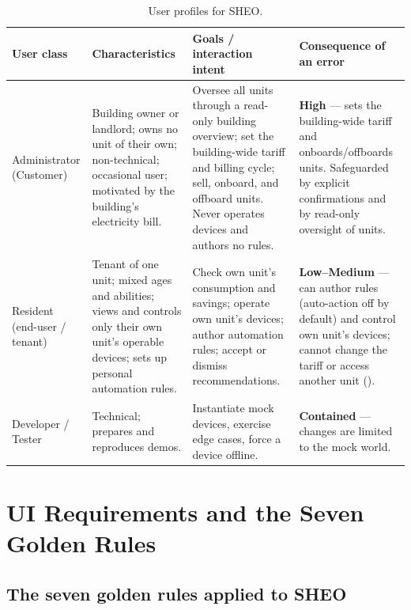 \begin{table}[htbp]
  \caption{User profiles for SHEO.}
  \label{tab:user-profiles}
  \begin{tabularx}{\linewidth}{@{} L{2.2cm} Y Y Y @{}}
    \toprule
    \textbf{User class} & \textbf{Characteristics} & \textbf{Goals / interaction intent}
      & \textbf{Consequence of an error} \\
    \midrule
    Administrator (Customer) &
      Building owner or landlord; owns no unit of their own; non-technical; occasional
      user; motivated by the building's electricity bill. &
      Oversee all units through a read-only building overview; set the building-wide
      tariff and billing cycle; sell, onboard, and offboard units. Never operates devices and
      authors no rules. &
      \textbf{High} — sets the building-wide tariff and onboards/offboards units.
      Safeguarded by explicit confirmations and by read-only oversight of units. \\
    \addlinespace
    Resident (end-user / tenant) &
      Tenant of one unit; mixed ages and abilities; views and controls only their own
      unit's operable devices; sets up personal automation rules. &
      Check own unit's consumption and savings; operate own unit's devices; author
      automation rules; accept or dismiss recommendations. &
      \textbf{Low–Medium} — can author rules (auto-action off by default) and control
      own unit's devices; cannot change the tariff or access another unit
      (). \\
    \addlinespace
    Developer / Tester &
      Technical; prepares and reproduces demos. &
      Instantiate mock devices, exercise edge cases, force a device offline. &
      \textbf{Contained} — changes are limited to the mock world. \\
    \bottomrule
  \end{tabularx}
\end{table}

\section{UI Requirements and the Seven Golden Rules}
\label{sec:ui-requirements}

\subsection{The seven golden rules applied to SHEO}

